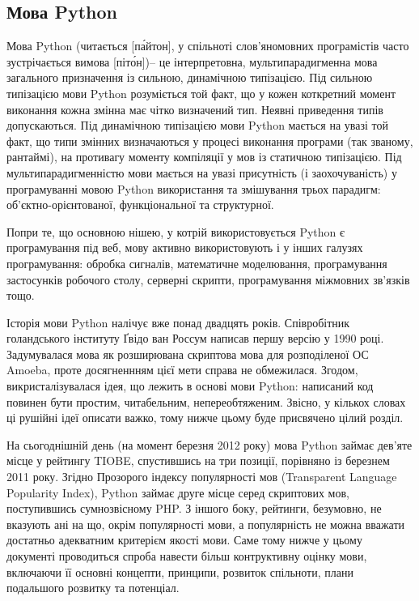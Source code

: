 \documentclass[a4paper, 12pt, onsedie]{article}
\begin{document}
\subsection{Мова Python}

Мова Python (читається [п\'{а}йтон], у спільноті слов'яномовних програмістів 
часто зустрічається вимова [піт\'{о}н])-- 
це інтерпретовна, мультипарадигменна мова загального призначення із сильною,
динамічною типізацією. Під сильною типізацією мови Python розуміється той факт, що у кожен коткретний момент
виконання кожна змінна має чітко визначений тип. Неявні приведення типів допускаються. Під динамічною типізацією
мови Python мається на увазі той факт, що типи змінних визначаються у процесі виконання програми (так званому,
рантаймі), на противагу моменту компіляції у мов із статичною типізацією. Під мультипарадигменністю мови мається
на увазі присутність (і заохочуваність) у програмуванні мовою Python використання та змішування трьох парадигм:
об'єктно-орієнтованої, функціональної та структурної.

Попри те, що основною нішею, у котрій використовується Python є програмування під веб, мову активно використовують і
у інших галузях програмування: обробка сигналів, математичне моделювання, програмування застосунків робочого
столу, серверні скрипти, програмування міжмовних зв'язків тощо.

Історія мови Python налічує вже понад двадцять років. Співробітник голандського інституту Ґвідо ван Россум
написав першу версію у 1990 році. Задумувалася мова як розширювана скриптова мова для розподіленої ОС Amoeba,
проте досягненнням цієї мети справа не обмежилася. Згодом, викристалізувалася ідея, що лежить в основі
мови Python: написаний код повинен бути простим, читабельним, непереобтяженим. Звісно, у кількох словах ці
рушійні ідеї описати важко, тому нижче цьому буде присвячено цілий розділ.

На сьогоднішній день (на момент березня 2012 року) мова Python займає дев'яте місце у рейтингу TIOBE,
спустившись на три позиції, порівняно із березнем 2011 року. Згідно Прозорого індексу популярності мов 
(Transparent Language Popularity Index), Python займає друге місце серед скриптових мов, поступившись 
сумнозвісному PHP. З іншого боку, рейтинги, безумовно, не вказують ані на що, окрім популярності мови,
а популярність не можна вважати достатньо адекватним критерієм якості мови. Саме тому нижче у цьому документі 
проводиться спроба навести більш контруктивну оцінку мови, включаючи її основні концепти, принципи, розвиток 
спільноти, плани подальшого розвитку та потенціал. 
\end{document}
